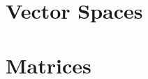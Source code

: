 \documentclass[11pt,oneside]{book}
\begin{document}





\newpage
\chapter{Vector Spaces}

\newpage
\chapter{Matrices}




\end{document}
